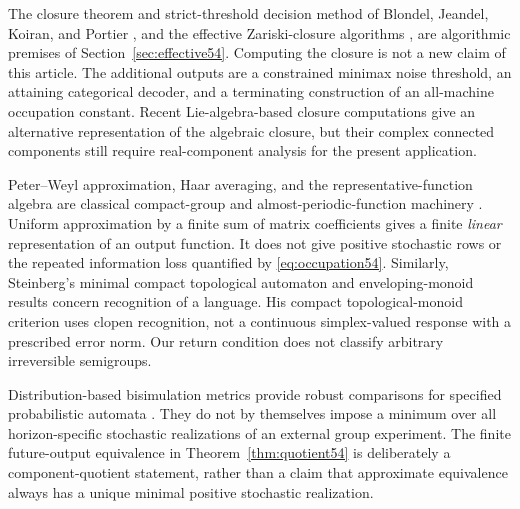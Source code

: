 The closure theorem and strict-threshold decision method of Blondel, Jeandel, Koiran, and Portier \cite{BJKP}, and the effective Zariski-closure algorithms \cite{DJK,NPSW}, are algorithmic premises of Section~\ref{sec:effective54}. Computing the closure is not a new claim of this article. The additional outputs are a constrained minimax noise threshold, an attaining categorical decoder, and a terminating construction of an all-machine occupation constant. Recent Lie-algebra-based closure computations \cite{deGraaf} give an alternative representation of the algebraic closure, but their complex connected components still require real-component analysis for the present application.

Peter--Weyl approximation, Haar averaging, and the representative-function algebra are classical compact-group and almost-periodic-function machinery \cite{Folland}. Uniform approximation by a finite sum of matrix coefficients gives a finite \emph{linear} representation of an output function. It does not give positive stochastic rows or the repeated information loss quantified by \eqref{eq:occupation54}. Similarly, Steinberg's minimal compact topological automaton and enveloping-monoid results \cite[Theorems 2.2 and 2.6]{Steinberg} concern recognition of a language. His compact topological-monoid criterion \cite[Proposition 2.8]{Steinberg} uses clopen recognition, not a continuous simplex-valued response with a prescribed error norm. Our return condition does not classify arbitrary irreversible semigroups.

Distribution-based bisimulation metrics provide robust comparisons for specified probabilistic automata \cite{FSZ}. They do not by themselves impose a minimum over all horizon-specific stochastic realizations of an external group experiment. The finite future-output equivalence in Theorem~\ref{thm:quotient54} is deliberately a component-quotient statement, rather than a claim that approximate equivalence always has a unique minimal positive stochastic realization.

